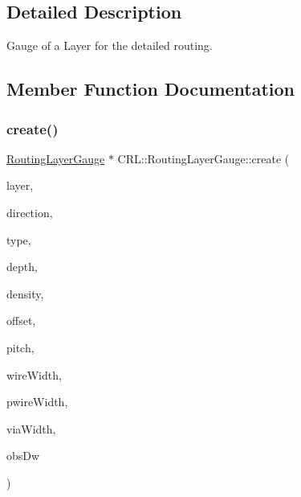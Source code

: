 \subsection{Detailed Description}
Gauge of a Layer for the detailed routing. 

\subsection{Member Function Documentation}
\mbox{\label{classCRL_1_1RoutingLayerGauge_afb41e7be2a6d258a691aacbe7a78154f}} 
\subsubsection{\texorpdfstring{create()}{create()}}
{\footnotesize\ttfamily \mbox{\hyperlink{classCRL_1_1RoutingLayerGauge}{Routing\+Layer\+Gauge}} $\ast$ C\+R\+L\+::\+Routing\+Layer\+Gauge\+::create (\begin{DoxyParamCaption}\item[{const \textbf{ Layer} $\ast$}]{layer,  }\item[{\mbox{\hyperlink{namespaceConstant_ac081a99f2b64361919ed5d9f37c0f9af}{Constant\+::\+Direction}}}]{direction,  }\item[{\mbox{\hyperlink{namespaceConstant_ab2e46a17cc373a268c5c24fa0e2067e5}{Constant\+::\+Layer\+Gauge\+Type}}}]{type,  }\item[{unsigned int}]{depth,  }\item[{double}]{density,  }\item[{\textbf{ Db\+U\+::\+Unit}}]{offset,  }\item[{\textbf{ Db\+U\+::\+Unit}}]{pitch,  }\item[{\textbf{ Db\+U\+::\+Unit}}]{wire\+Width,  }\item[{\textbf{ Db\+U\+::\+Unit}}]{pwire\+Width,  }\item[{\textbf{ Db\+U\+::\+Unit}}]{via\+Width,  }\item[{\textbf{ Db\+U\+::\+Unit}}]{obs\+Dw }\end{DoxyParamCaption})\hspace{0.3cm}{\ttfamily [static]}}


